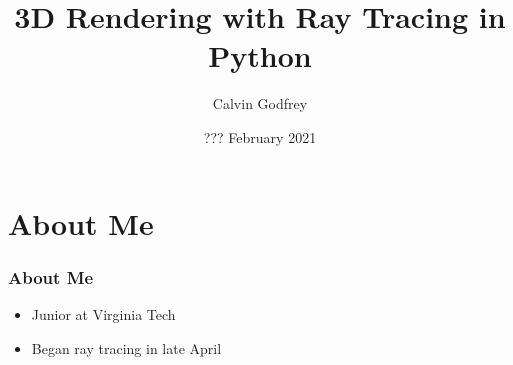 \documentclass{beamer}
\title[Ray Tracing] %
{3D Rendering with Ray Tracing in Python}
\author{Calvin Godfrey}
\institute[] %
{Virginia Polytechnic Institute and State University}
\date[https://github.com/calvin-godfrey/RenderingWorkshop]{??? February 2021}
\begin{document}
\begin{frame}
	\titlepage
\end{frame}

\section{About Me}

\begin{frame}
	\frametitle{About Me}
	\begin{itemize}
		\item Junior at Virginia Tech
		\item Began ray tracing in late April
	\end{itemize}
\end{frame}
\end{document}
